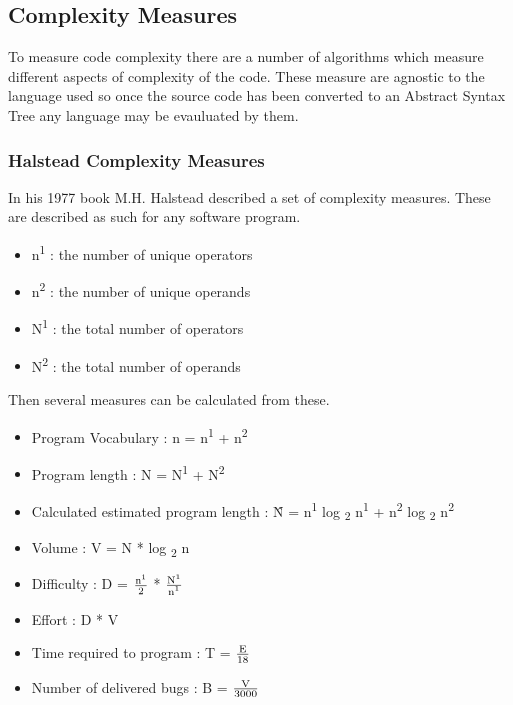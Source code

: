 \subsection{Complexity Measures}
To measure code complexity there are a number of algorithms which measure different aspects of complexity of the code. These measure are agnostic to the language used so once the source code has been converted to an Abstract Syntax Tree any language may be evauluated by them.
\subsubsection{Halstead Complexity Measures}
In his 1977 book M.H. Halstead described a set of complexity measures. \cite{HalsteadComplexity}
\newline
These are described as such for any software program.
\begin{itemize}
    \item n\textsuperscript{1} : the number of unique operators
    \item n\textsuperscript{2} : the number of unique operands
    \item N\textsuperscript{1} : the total number of operators
    \item N\textsuperscript{2} : the total number of operands
\end{itemize}
Then several measures can be calculated from these.
\begin{itemize}
    \item Program Vocabulary    : n = n\textsuperscript{1} + n\textsuperscript{2}
    \item Program length        : N = N\textsuperscript{1} + N\textsuperscript{2}
    \item Calculated estimated program length : \^{N} = n\textsuperscript{1} log \textsubscript{2} n\textsuperscript{1} + n\textsuperscript{2} log \textsubscript{2} n\textsuperscript{2}
    \item Volume                : V = N * log \textsubscript{2} n
    \item Difficulty            : D =  $\frac{\text{n\textsuperscript{1}}}{\text{2}}$ * $\frac{\text{N\textsuperscript{1}}}{\text{n\textsuperscript{1}}}$
    \item Effort                : D * V
    \item Time required to program : T = $\frac{\text{E}}{\text{18}}$
    \item Number of delivered bugs : B = $\frac{\text{V}}{\text{3000}}$
\end{itemize}


